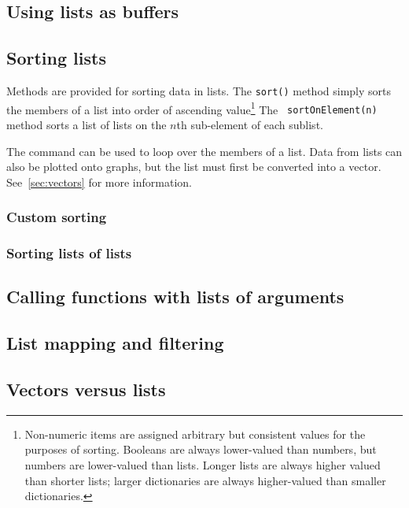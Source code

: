 \subsection{Using lists as buffers}

\subsection{Sorting lists}

Methods are provided for sorting data in lists. The {\tt sort()} method simply
sorts the members of a list into order of ascending value\footnote{Non-numeric
items are assigned arbitrary but consistent values for the purposes of sorting.
Booleans are always lower-valued than numbers, but numbers are lower-valued
than lists. Longer lists are always higher valued than shorter lists; larger
dictionaries are always higher-valued than smaller dictionaries.} The {\tt
sortOnElement(n)} method sorts a list of lists on the $n$th sub-element of each
sublist.

\vspace{3mm}

\vspace{3mm}

The  command can be used to loop over the members of a list.
Data from lists can also be plotted onto graphs, but the list must first be
converted into a vector. See~\ref{sec:vectors} for more information.

\subsubsection{Custom sorting}

\subsubsection{Sorting lists of lists}

\subsection{Calling functions with lists of arguments}

\subsection{List mapping and filtering}

\subsection{Vectors versus lists}

